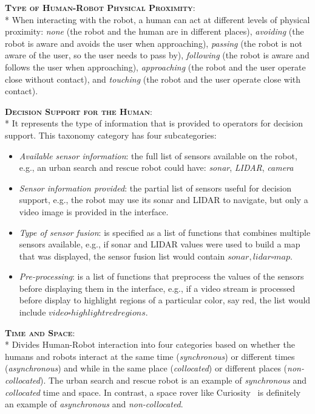 {\bfseries \scshape Type of Human-Robot Physical Proximity}:\\*
When interacting with the robot, a human can act at different levels of physical proximity: \textit{none} (the robot and the human are in different places), 
\textit{avoiding} (the robot is aware and avoids the user when approaching), \textit{passing} (the robot is not aware of the user, so the user needs to pass by), 
\textit{following} (the robot is aware and follows the user when approaching), 
\textit{approaching} (the robot and the user operate close without contact), and \textit{touching} (the robot and the user operate close with contact).

{\bfseries \scshape Decision Support for the Human}:\\*
It represents the type of information that is provided to operators for decision support. 
This taxonomy category has four subcategories: 
\begin{itemize}
    \item \textit{Available sensor information}: the full list of sensors available on the robot, e.g., an urban search and rescue robot could have: \textit{sonar}, \textit{LIDAR}, \textit{camera}
    \item \textit{Sensor information provided}: the partial list of sensors useful for decision support, e.g., the robot may use its sonar and LIDAR to navigate, but only a video image is provided in the interface.
    \item \textit{Type of sensor fusion}: is specified as a list of functions that combines multiple sensors available, e.g., if sonar and LIDAR values were used to build a map that was displayed, the sensor fusion list would contain \( {{sonar, lidar} \square map } \).
    \item \textit{Pre-processing}: is a list of functions that preprocess the values of the sensors before displaying them in the interface, e.g., if a video stream is processed before display to highlight regions of a particular color, say red, the list would include \( {video \square highlight red regions } \).
\end{itemize}

{\bfseries \scshape Time and Space}:\\*
Divides Human-Robot interaction into four categories based on whether the humans and robots interact at the same time (\textit{synchronous}) or different times (\textit{asynchronous}) and while in the same place (\textit{collocated}) or different places (\textit{non-collocated}).
The urban search and rescue robot is an example of \textit{synchronous} and \textit{collocated} time and space. 
In contrast, a space rover like Curiosity~\cite{curiosity} is definitely an example of \textit{asynchronous} and \textit{non-collocated}.

